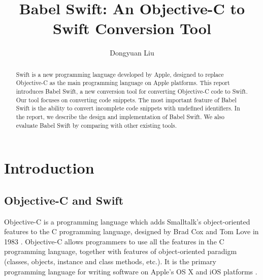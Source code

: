 \documentclass{sfuthesis}
\title{Babel Swift: An Objective-C to Swift Conversion Tool}
\author{Dongyuan Liu}
\begin{document}
\frontmatter
\maketitle{}

\begin{abstract}
Swift is a new programming language developed by Apple, designed to replace Objective-C as the main programming language on Apple platforms. This report introduces Babel Swift, a new conversion tool for converting Objective-C code to Swift. Our tool focuses on converting code snippets. The most important feature of Babel Swift is the ability to convert incomplete code snippets with undefined identifiers. In the report, we describe the design and implementation of Babel Swift. We also evaluate Babel Swift by comparing with other existing tools.
\end{abstract}





\tableofcontents\clearpage
{}\listoftables\clearpage
{}\listoflistings





%
%

\mainmatter%

\chapter{Introduction}

\section{Objective-C and Swift}

Objective-C is a programming language which adds Smalltalk's object-oriented features to the C programming language, designed by Brad Cox and Tom Love in 1983 \cite{cox1983object}. Objective-C allows programmers to use all the features in the C programming language, together with features of object-oriented paradigm (classes, objects, instance and class methods, etc.). It is the primary programming language for writing software on Apple's OS X and iOS platforms \cite{aboutobjc}.
\end{document}
